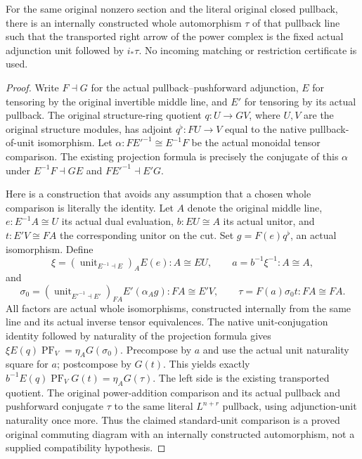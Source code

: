 \begin{lemma}
\label{lem:seshadri-actual-cartier-quotient-standard-unit}
For the same original nonzero section and the literal original closed
pullback, there is an internally constructed whole automorphism $\tau$
of that pullback line such that the transported right arrow of the power
complex is the fixed actual adjunction unit followed by $i_*\tau$.
No incoming matching or restriction certificate is used.
\end{lemma}
\begin{proof}
Write $F\dashv G$ for the actual pullback--pushforward adjunction,
$E$ for tensoring by the original invertible middle line, and $E'$ for
tensoring by its actual pullback. The original structure-ring quotient
$q:U\to GV$, where $U,V$ are the original structure modules, has adjoint
$q^\flat:FU\to V$ equal to the native pullback-of-unit isomorphism.
Let $\alpha:F E'^{-1}\cong E^{-1}F$ be the actual monoidal tensor
comparison. The existing projection formula is precisely the conjugate
of this $\alpha$ under $E^{-1}F\dashv GE$ and $FE'^{-1}\dashv E'G$.

Here is a construction that avoids any assumption that a chosen whole
comparison is literally the identity. Let $A$ denote the original middle
line, $e:E^{-1}A\cong U$ its actual dual evaluation, $b:EU\cong A$ its
actual unitor, and $t:E'V\cong FA$ the corresponding unitor on the cut.
Set $g=F(e)q^\flat$, an actual isomorphism. Define
\[
 \xi=(\operatorname{unit}_{E^{-1}\dashv E})_A E(e):A\cong EU,
 \qquad a=b^{-1}\xi^{-1}:A\cong A,
\]
and
\[
 \sigma_0=(\operatorname{unit}_{E'^{-1}\dashv E'})_{FA}
                E'(\alpha_A g):FA\cong E'V,
 \qquad \tau=F(a)\sigma_0t:FA\cong FA.
\]
All factors are actual whole isomorphisms, constructed internally from
the same line and its actual inverse tensor equivalences.
The native unit-conjugation identity followed by naturality of the
projection formula gives
$\xi E(q)\operatorname{PF}_V=\eta_A G(\sigma_0)$.
Precompose by $a$ and use the actual unit naturality square for $a$;
postcompose by $G(t)$. This yields exactly
$b^{-1}E(q)\operatorname{PF}_VG(t)=\eta_A G(\tau)$.
The left side is the existing transported quotient.
The original power-addition comparison and its actual pullback and
pushforward conjugate $\tau$ to the same literal $L^{n+r}$ pullback,
using adjunction-unit naturality once more. Thus the claimed standard-unit
comparison is a proved original commuting diagram with an internally
constructed automorphism, not a supplied compatibility hypothesis.
\end{proof}

